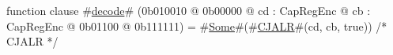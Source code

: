 function clause #\hyperref[sailMIPSzdecode]{decode}# (0b010010 @ 0b00000 @ cd : CapRegEnc @ cb : CapRegEnc @    0b01100 @ 0b111111) = #\hyperref[sailMIPSzSome]{Some}#(#\hyperref[sailMIPSzCJALR]{CJALR}#(cd, cb, true)) /* CJALR */
